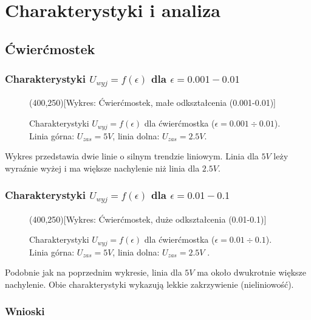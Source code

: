 \documentclass[12pt, a4paper]{article}
\begin{document}
	\newpage
	\section{Charakterystyki i analiza}
	
	\subsection{Ćwierćmostek}
	
	\subsubsection{Charakterystyki $U_{wyj} = f(\epsilon)$ dla $\epsilon = 0.001-0.01$}
	
	\begin{figure}[H]
		\centering
		\framebox(400,250){[Wykres: Ćwierćmostek, małe odkształcenia (0.001-0.01)]}
		\caption{Charakterystyki $U_{wyj} = f(\epsilon)$ dla ćwierćmostka ($\epsilon = 0.001 \div 0.01$).  Linia górna: $U_{zas} = 5 V$, linia dolna: $U_{zas} = 2.5 V$.}
	\end{figure}
	
	Wykres przedstawia dwie linie o silnym trendzie liniowym. Linia dla $5 V$ leży wyraźnie wyżej i ma większe nachylenie niż linia dla $2.5 V$.
	
	\subsubsection{Charakterystyki $U_{wyj} = f(\epsilon)$ dla $\epsilon = 0.01-0.1$}
	
	\begin{figure}[H]
		\centering
		\framebox(400,250){[Wykres: Ćwierćmostek, duże odkształcenia (0.01-0.1)]}
		\caption{Charakterystyki $U_{wyj} = f(\epsilon)$ dla ćwierćmostka ($\epsilon = 0.01 \div 0.1$).  Linia górna: $U_{zas} = 5 V$, linia dolna: $U_{zas} = 2.5 V$ .}
	\end{figure}
	
	Podobnie jak na poprzednim wykresie, linia dla $5 V$ ma około dwukrotnie większe nachylenie. Obie charakterystyki wykazują lekkie zakrzywienie (nieliniowość).
	
	\subsubsection{Wnioski}
	
\end{document}
